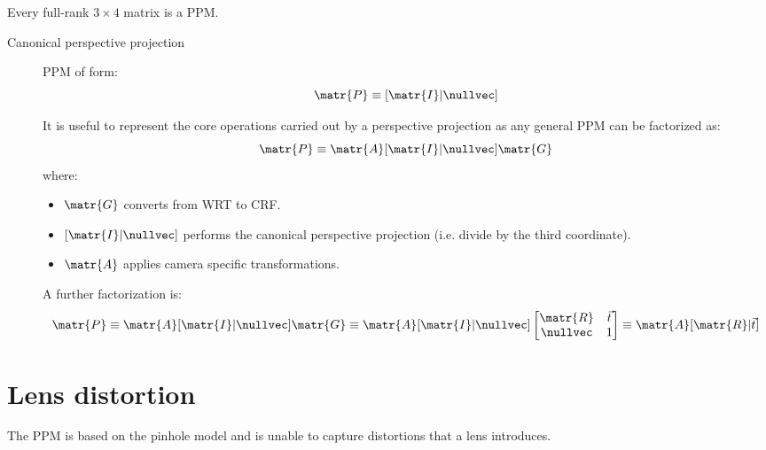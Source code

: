 \begin{description}
        \begin{remark}
            Every full-rank $3 \times 4$ matrix is a PPM.
        \end{remark}

        \begin{description}
            \item[Canonical perspective projection] 
                PPM of form:
                \[ \matr{P} \equiv [\matr{I} | \nullvec] \]

                It is useful to represent the core operations carried out by a perspective projection as any general PPM can be factorized as:
                \[ \matr{P} \equiv \matr{A} [\matr{I} | \nullvec] \matr{G} \]
                where:
                \begin{itemize}
                    \item $\matr{G}$ converts from WRT to CRF.
                    \item $[\matr{I} | \nullvec]$ performs the canonical perspective projection (i.e. divide by the third coordinate).
                    \item $\matr{A}$ applies camera specific transformations.
                \end{itemize}

                A further factorization is:
                \[ 
                    \matr{P} \equiv \matr{A} [\matr{I} | \nullvec] \matr{G} \equiv 
                    \matr{A}[\matr{I} | \nullvec] \begin{bmatrix} \matr{R} & \vec{t} \\ \nullvec & 1 \end{bmatrix} \equiv
                    \matr{A} [ \matr{R} | \vec{t} ]
                \]
        \end{description}
\end{description}



\section{Lens distortion}

The PPM is based on the pinhole model and is unable to capture distortions that a lens introduces.

